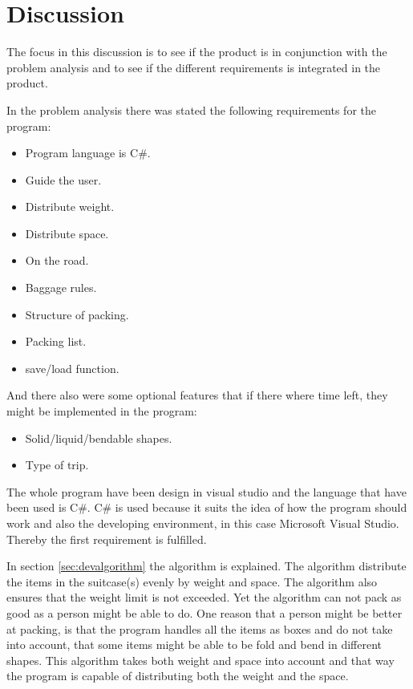 \section{Discussion}
The focus in this discussion is to see if the product is in conjunction with the problem analysis  and to see if the different requirements  is integrated in the product.

In the problem analysis there was stated the following requirements for the program:

\begin{itemize}
\item Program language is C\#.
\item Guide the user.
\item Distribute weight.
\item Distribute space.
\item On the road.
\item Baggage rules.
\item Structure of packing.
\item Packing list.
\item save/load function.
\end{itemize}

And there also were some optional features that if there where time left, they might be implemented in the program:
\begin{itemize}
\item Solid/liquid/bendable shapes.
\item Type of trip.
\end{itemize}

The whole program have been design in visual studio and the language that have been used is C\#. C\# is used because it suits the idea of how the program should work and also the developing environment, in this case Microsoft Visual Studio. Thereby the first requirement is fulfilled.

In section \ref{sec:devalgorithm} the algorithm is explained. The algorithm distribute the items in the suitcase(s) evenly by weight and space. The algorithm also ensures that the weight limit is not exceeded. Yet the algorithm can not pack as good as a person might be able to do. One reason that a person might be better at packing, is that the program handles all the items as boxes and do not take into account, that some items might be able to be fold and bend in different shapes. This algorithm takes both weight and space into account and that way the program is capable of distributing both the weight and the space.

